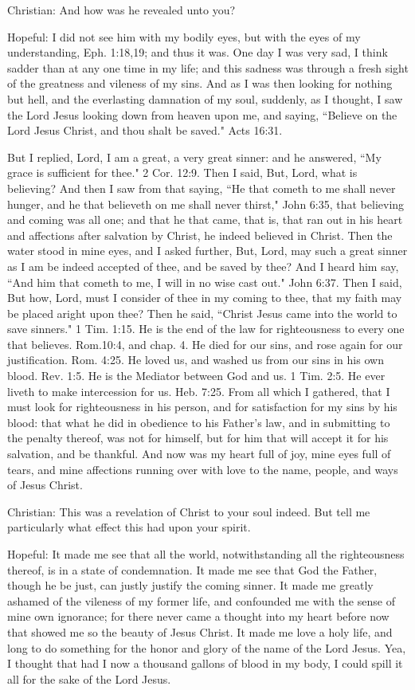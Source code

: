 Christian: And how was he revealed unto you?

Hopeful: I did not see him with my bodily eyes, but with the eyes of my understanding, Eph. 1:18,19; and thus it was. One day I was very sad, I think sadder than at any one time in my life; and this sadness was through a fresh sight of the greatness and vileness of my sins. And as I was then looking for nothing but hell, and the everlasting damnation of my soul, suddenly, as I thought, I saw the Lord Jesus looking down from heaven upon me, and saying, ``Believe on the Lord Jesus Christ, and thou shalt be saved." Acts 16:31.

But I replied, Lord, I am a great, a very great sinner: and he answered, ``My grace is sufficient for thee." 2 Cor. 12:9. Then I said, But, Lord, what is believing? And then I saw from that saying, ``He that cometh to me shall never hunger, and he that believeth on me shall never thirst," John 6:35, that believing and coming was all one; and that he that came, that is, that ran out in his heart and affections after salvation by Christ, he indeed believed in Christ. Then the water stood in mine eyes, and I asked further, But, Lord, may such a great sinner as I am be indeed accepted of thee, and be saved by thee? And I heard him say, ``And him that cometh to me, I will in no wise cast out." John 6:37. Then I said, But how, Lord, must I consider of thee in my coming to thee, that my faith may be placed aright upon thee? Then he said, ``Christ Jesus came into the world to save sinners." 1 Tim. 1:15. He is the end of the law for righteousness to every one that believes. Rom.10:4, and chap. 4. He died for our sins, and rose again for our justification. Rom. 4:25. He loved us, and washed us from our sins in his own blood. Rev. 1:5. He is the Mediator between God and us. 1 Tim. 2:5. He ever liveth to make intercession for us. Heb. 7:25. From all which I gathered, that I must look for righteousness in his person, and for satisfaction for my sins by his blood: that what he did in obedience to his Father's law, and in submitting to the penalty thereof, was not for himself, but for him that will accept it for his salvation, and be thankful. And now was my heart full of joy, mine eyes full of tears, and mine affections running over with love to the name, people, and ways of Jesus Christ.

Christian: This was a revelation of Christ to your soul indeed. But tell me particularly what effect this had upon your spirit.

Hopeful: It made me see that all the world, notwithstanding all the righteousness thereof, is in a state of condemnation. It made me see that God the Father, though he be just, can justly justify the coming sinner. It made me greatly ashamed of the vileness of my former life, and confounded me with the sense of mine own ignorance; for there never came a thought into my heart before now that showed me so the beauty of Jesus Christ. It made me love a holy life, and long to do something for the honor and glory of the name of the Lord Jesus. Yea, I thought that had I now a thousand gallons of blood in my body, I could spill it all for the sake of the Lord Jesus.

